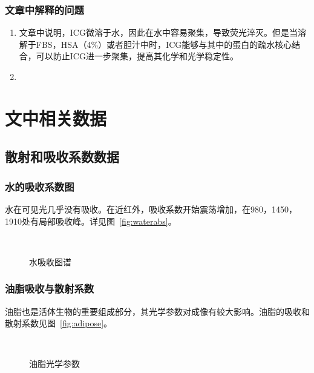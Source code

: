 \documentclass[cn,11pt,chinese]{elegantbook}
\begin{document}
\subsection{文章中解释的问题}
\begin{enumerate}[itemsep=1.5ex]
   \item {}
  文章中说明，ICG微溶于水，因此在水中容易聚集，导致荧光淬灭。但是当溶解于FBS，HSA（4\%）或者胆汁中时，ICG能够与其中的蛋白的疏水核心结合，可以防止ICG进一步聚集，提高其化学和光学稳定性。
   \item {}

 \end{enumerate} 


\appendix
\chapter{文中相关数据}

\section{散射和吸收系数数据}

\subsection{水的吸收系数图}
水在可见光几乎没有吸收。在近红外，吸收系数开始震荡增加，在980，1450，1910处有局部吸收峰。详见图~\vref{fig:waterabs}。
\begin{figure}[ht]
	\centering
	 \\
  \caption{水吸收图谱}
	\label{fig:waterabs}
\end{figure}

\subsection{油脂吸收与散射系数}
油脂也是活体生物的重要组成部分，其光学参数对成像有较大影响。油脂的吸收和散射系数见图~\vref{fig:adipose}。
\begin{figure}[htp]
	\centering
	 \\
  \caption{油脂光学参数}
	\label{fig:adipose}
\end{figure}
\end{document}
